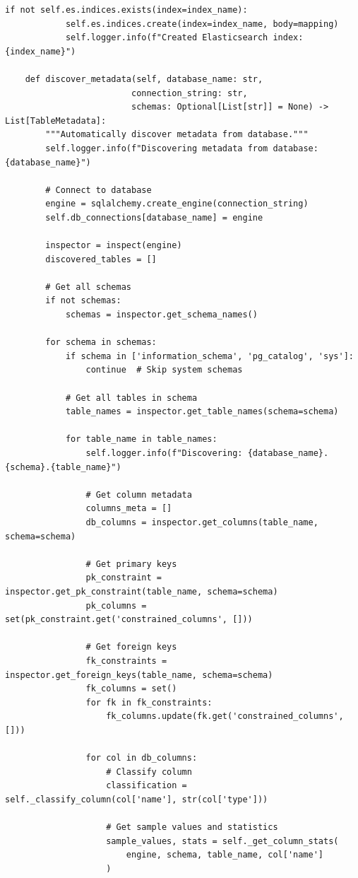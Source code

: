 \begin{lstlisting}[style=python, caption=MetadataCatalog with Automated Metadata Discovery]
        if not self.es.indices.exists(index=index_name):
            self.es.indices.create(index=index_name, body=mapping)
            self.logger.info(f"Created Elasticsearch index: {index_name}")

    def discover_metadata(self, database_name: str,
                         connection_string: str,
                         schemas: Optional[List[str]] = None) -> List[TableMetadata]:
        """Automatically discover metadata from database."""
        self.logger.info(f"Discovering metadata from database: {database_name}")

        # Connect to database
        engine = sqlalchemy.create_engine(connection_string)
        self.db_connections[database_name] = engine

        inspector = inspect(engine)
        discovered_tables = []

        # Get all schemas
        if not schemas:
            schemas = inspector.get_schema_names()

        for schema in schemas:
            if schema in ['information_schema', 'pg_catalog', 'sys']:
                continue  # Skip system schemas

            # Get all tables in schema
            table_names = inspector.get_table_names(schema=schema)

            for table_name in table_names:
                self.logger.info(f"Discovering: {database_name}.{schema}.{table_name}")

                # Get column metadata
                columns_meta = []
                db_columns = inspector.get_columns(table_name, schema=schema)

                # Get primary keys
                pk_constraint = inspector.get_pk_constraint(table_name, schema=schema)
                pk_columns = set(pk_constraint.get('constrained_columns', []))

                # Get foreign keys
                fk_constraints = inspector.get_foreign_keys(table_name, schema=schema)
                fk_columns = set()
                for fk in fk_constraints:
                    fk_columns.update(fk.get('constrained_columns', []))

                for col in db_columns:
                    # Classify column
                    classification = self._classify_column(col['name'], str(col['type']))

                    # Get sample values and statistics
                    sample_values, stats = self._get_column_stats(
                        engine, schema, table_name, col['name']
                    )


\end{lstlisting}
